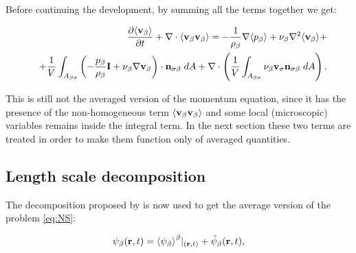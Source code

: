 

\noindent Before continuing the development, by summing all the terms together we get:

\begin{eqnarray}
&& \dfrac{\partial {\left< \textbf{v}_{\beta}\right>}}{\partial t} + \nabla \cdot {\left< \textbf{v}_{\beta}\textbf{v}_{\beta}\right>} = -\dfrac{1}{\rho_{\beta}} \nabla {\left< p_{\beta}\right>} + \nu_{\beta}\nabla^2 {\left< \textbf{v}_{\beta} \right>} + \nonumber \\
&& +\dfrac{1}{V} \int_{A_{\beta \sigma}} \left( -\dfrac{p_{\beta}}{\rho_{\beta}} \mathbf{I} + \nu_{\beta} \nabla \textbf{v}_{\beta}  \right)\cdot \mathbf{n}_{\sigma \beta} \;dA +  \nabla \cdot \left( \dfrac{1}{V} \int_{A_{\beta \sigma}}  \nu_{\beta} \textbf{v}_{\sigma} \mathbf{n}_{\sigma \beta} \;dA \right). 
\label{eq:mom_2}
\end{eqnarray}

This is still not the averaged version of the momentum equation, since it has the presence of the non-homogeneous term ${\left< \textbf{v}_{\beta}\textbf{v}_{\beta} \right>}$ and some local (microscopic) variables remains inside the integral term.
In the next section these two terms are treated in order to make them function only of averaged quantities.

\subsection{Length scale decomposition}

The decomposition proposed by \citet{gray1975derivation} is now used to get the average version of the problem \eqref{eq:NS}:

\begin{equation}
\psi_{\beta}(\mathbf{r},t) = {\left< \psi_{\beta} \right>}^{\beta}|_{(\mathbf{r},t)} + \tilde{\psi}_{\beta}(\mathbf{r},t),
\label{eq:gray}
\end{equation}

